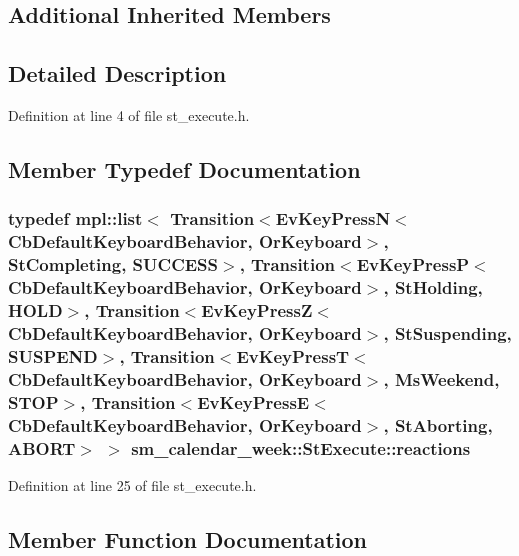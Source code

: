 \subsection*{Additional Inherited Members}


\subsection{Detailed Description}


Definition at line 4 of file st\+\_\+execute.\+h.



\subsection{Member Typedef Documentation}
\subsubsection[{\texorpdfstring{reactions}{reactions}}]{\setlength{\rightskip}{0pt plus 5cm}typedef mpl\+::list$<$ Transition$<$Ev\+Key\+PressN$<$Cb\+Default\+Keyboard\+Behavior, {\bf Or\+Keyboard}$>$, {\bf St\+Completing}, {\bf S\+U\+C\+C\+E\+SS}$>$, Transition$<$Ev\+Key\+PressP$<$Cb\+Default\+Keyboard\+Behavior, {\bf Or\+Keyboard}$>$, {\bf St\+Holding}, {\bf H\+O\+LD}$>$, Transition$<$Ev\+Key\+PressZ$<$Cb\+Default\+Keyboard\+Behavior, {\bf Or\+Keyboard}$>$, {\bf St\+Suspending}, {\bf S\+U\+S\+P\+E\+ND}$>$, Transition$<$Ev\+Key\+PressT$<$Cb\+Default\+Keyboard\+Behavior, {\bf Or\+Keyboard}$>$, {\bf Ms\+Weekend}, {\bf S\+T\+OP}$>$, Transition$<$Ev\+Key\+PressE$<$Cb\+Default\+Keyboard\+Behavior, {\bf Or\+Keyboard}$>$, {\bf St\+Aborting}, {\bf A\+B\+O\+RT}$>$ $>$ {\bf sm\+\_\+calendar\+\_\+week\+::\+St\+Execute\+::reactions}}\hypertarget{structsm__calendar__week_1_1StExecute_aca331139b4bd3db4960af162cddcecaa}{}\label{structsm__calendar__week_1_1StExecute_aca331139b4bd3db4960af162cddcecaa}


Definition at line 25 of file st\+\_\+execute.\+h.



\subsection{Member Function Documentation}
